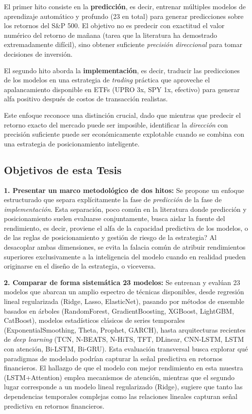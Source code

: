 ﻿\documentclass[11pt,a4paper]{article}
\begin{document}
El primer hito consiste en la \textbf{predicci\'on}, es decir, entrenar m\'ultiples modelos de aprendizaje autom\'atico y profundo (23 en total) para generar predicciones sobre los retornos del S\&P 500. El objetivo no es predecir con exactitud el valor num\'erico del retorno de ma\~nana (tarea que la literatura ha demostrado extremadamente dif\'icil), sino obtener suficiente \textit{precisi\'on direccional} para tomar decisiones de inversi\'on.

El segundo hito aborda la \textbf{implementaci\'on}, es decir, traducir las predicciones de los modelos en una estrategia de \textit{trading} pr\'actica que aproveche el apalancamiento disponible en ETFs (UPRO 3x, SPY 1x, efectivo) para generar alfa positivo despu\'es de costos de transacci\'on realistas.

Este enfoque reconoce una distinci\'on crucial, dado que mientras que predecir el retorno exacto del mercado puede ser imposible, identificar la \textit{direcci\'on} con precisi\'on suficiente puede ser econ\'omicamente explotable cuando se combina con una estrategia de posicionamiento inteligente.

\subsection{Objetivos de esta Tesis}

\textbf{1. Presentar un marco metodol\'ogico de dos hitos:} Se propone un enfoque estructurado que separa expl\'icitamente la fase de \textit{predicci\'on} de la fase de \textit{implementaci\'on}. Esta separaci\'on, poco com\'un en la literatura donde predicci\'on y posicionamiento suelen evaluarse conjuntamente, busca aislar la fuente del rendimiento, es decir, \textquestiondown proviene el alfa de la capacidad predictiva de los modelos, o de las reglas de posicionamiento y gesti\'on de riesgo de la estrategia? Al desacoplar ambas dimensiones, se evita la falacia com\'un de atribuir rendimientos superiores exclusivamente a la inteligencia del modelo cuando en realidad pueden originarse en el dise\~no de la estrategia, o viceversa.

\textbf{2. Comparar de forma sistem\'atica 23 modelos:} Se entrenan y eval\'uan 23 modelos que abarcan un amplio espectro de t\'ecnicas disponibles, desde regresi\'on lineal regularizada (Ridge, Lasso, ElasticNet), pasando por m\'etodos de ensemble basados en \'arboles (RandomForest, GradientBoosting, XGBoost, LightGBM, CatBoost), modelos estad\'isticos cl\'asicos de series temporales (ExponentialSmoothing, Theta, Prophet, GARCH), hasta arquitecturas recientes de \textit{deep learning} (TCN, N-BEATS, N-HiTS, TFT, DLinear, CNN-LSTM, LSTM con atenci\'on, Bi-LSTM, Bi-GRU). Esta evaluaci\'on transversal busca explorar qu\'e paradigmas de modelado podr\'ian capturar la se\~nal predictiva en retornos financieros. El hallazgo de que el modelo con mejor rendimiento en esta muestra (LSTM+Attention) emplea mecanismos de atenci\'on, mientras que el segundo lugar corresponde a un modelo lineal regularizado (Ridge), sugiere que tanto las dependencias temporales complejas como las relaciones lineales capturan se\~nal predictiva en retornos financieros.
\end{document}
